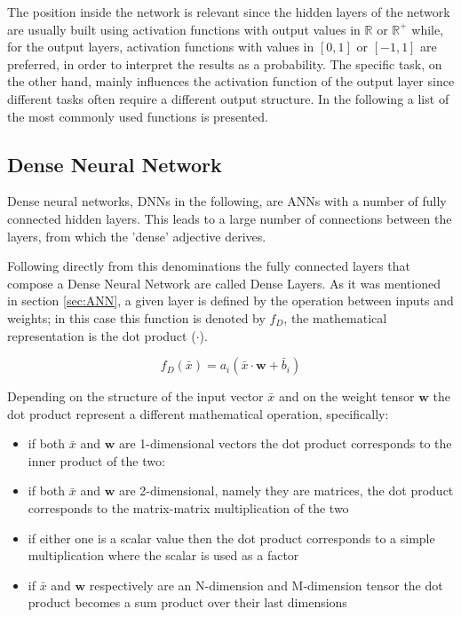 \documentclass[../../main.tex]{subfiles}
\begin{document}
The position inside the network is relevant since the hidden layers of the network are usually built using activation functions with output values in $\mathbb{R}$ or $\mathbb{R}^+$ while, for the output layers, activation functions with values in $[0,1]$ or $[-1,1]$ are preferred, in order to interpret the results as a probability.
The specific task, on the other hand, mainly influences the activation function of the output layer since different tasks often require a different output structure.
In the following a list of the most commonly used functions is presented.  



\clearpage
\vfill
    
\subsection{Dense Neural Network}
\label{sec:DNN}
Dense neural networks, DNNs in the following, are ANNs with a number of fully connected hidden layers. This leads to a large number of connections between the layers, from which the 'dense' adjective derives.  

Following directly from this denominations the fully connected layers that compose a Dense Neural Network are called Dense Layers. As it was mentioned in section \ref{sec:ANN}, a given layer is defined by the operation between inputs and weights; in this case this function is denoted by $f_D$, the mathematical representation is the dot product ($\cdot$).

\begin{equation}
    f_D (\bar{x})=a_i \left( \bar{x} \cdot \textbf{w} + \bar{b}_i \right) 
    \label{eq:layer_dense}
\end{equation}

Depending on the structure of the input vector $\bar{x}$ and on the weight tensor $\boldsymbol{w}$ the dot product represent a different mathematical operation, specifically:
\begin{itemize}
    \item if both $\bar{x}$ and $\textbf{w}$ are 1-dimensional vectors the dot product corresponds to the inner product of the two:
    \item if both $\bar{x}$ and $\textbf{w}$ are 2-dimensional, namely they are matrices, the dot product corresponds to the matrix-matrix multiplication of the two
     \item if either one is a scalar value then the dot product corresponds to a simple multiplication where the scalar is used as a factor
     \item if $\bar{x}$ and $\boldsymbol{w}$ respectively are an N-dimension and M-dimension tensor the dot product becomes a sum product over their last dimensions
\end{itemize}
\end{document}
